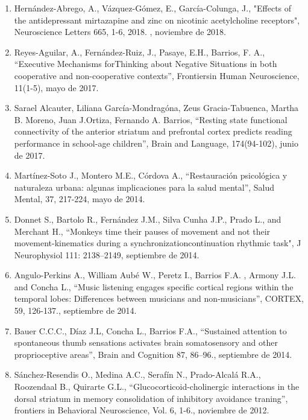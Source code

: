 \begin{enumerate}
\item Hernández-Abrego, A., Vázquez-Gómez, E., García-Colunga, J., "Effects of the antidepressant mirtazapine and zinc on nicotinic acetylcholine receptors", 
Neuroscience Letters 665, 1-6, 2018. ,  noviembre de 2018.

\item Reyes-Aguilar, A., Fernández-Ruiz, J., Pasaye, E.H., Barrios, F. A., “Executive Mechanisms forThinking about Negative Situations in both cooperative and 
non-cooperative contexts”, Frontiersin Human Neuroscience, 11(1-5),  mayo de 2017.

\item Sarael Alcauter, Liliana García-Mondragóna, Zeus Gracia-Tabuenca, Martha B. Moreno, Juan J.Ortiza, Fernando A. Barrios, “Resting state functional 
connectivity of the anterior striatum and prefrontal cortex predicts reading performance in school-age children”, Brain and Language, 174(94-102),  junio de 
2017.

\item Martínez-Soto J., Montero M.E., Córdova A., “Restauración psicológica y naturaleza urbana: algunas implicaciones para la salud mental”, Salud Mental, 37, 
217-224,  mayo de 2014.

\item Donnet S., Bartolo R., Fernández J.M., Silva Cunha J.P., Prado L., and Merchant H., “Monkeys time their pauses of movement and not their 
movement-kinematics 
during a synchronizationcontinuation rhythmic task", J Neurophysiol 111: 2138–2149,  septiembre de 2014.

\item Angulo-Perkins A., William Aubé W., Peretz I., Barrios F.A. , Armony J.L. and Concha L., “Music listening engages specific cortical regions within the 
temporal lobes: Differences between musicians and non-musicians”, CORTEX, 59, 126-137.,  septiembre de 2014.

\item Bauer C.C.C., Díaz J.L, Concha L., Barrios F.A., “Sustained attention to spontaneous thumb sensations activates brain somatosensory and other 
proprioceptive 
areas”, Brain and Cognition 87, 86–96.,  septiembre de 2014.

\item Sánchez-Resendis O., Medina A.C., Serafín N., Prado-Alcalá R.A., Roozendaal B., Quirarte G.L., “Glucocorticoid-cholinergic interactions in the dorsal 
striatum in memory consolidation of inhibitory avoidance traning”, frontiers in Behavioral Neuroscience, Vol. 6, 1-6.,  noviembre de 2012.


\end{enumerate}
